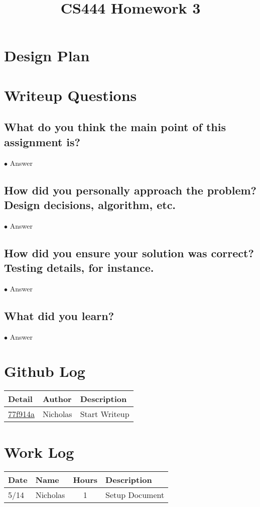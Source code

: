 \documentclass[letterpaper,10pt,fleqn,draftclsnofoot,onecolumn]{IEEEtran}
\title{CS444 Homework 3}
\author{\name}
\begin{document}
	\maketitle
	\hrulefill
	\section*{Design Plan}
	
	\section*{Writeup Questions}
	
	\subsection{What do you think the main point of this assignment is?}
	$\bullet$ Answer
	
	\subsection{How did you personally approach the problem? Design decisions, algorithm, etc.}
	$\bullet$ Answer	
	
	\subsection{How did you ensure your solution was correct? Testing details, for instance.}
	$\bullet$ Answer
	
	\subsection{What did you learn?}
	$\bullet$ Answer

	\section*{ Github Log }
	\begin{tabular}{l l p{1.5in}}\textbf{Detail} & \textbf{Author} & \textbf{Description}\\\hline
		\href{https://github.com/Skinnern/CS444/commit/77f914a6fe466b8115d31d7a97e08b2e86b00b7a}{77f914a} & Nicholas & Start Writeup\\\hline
	\end{tabular}
	
	
	\section*{Work Log}
	\begin{tabular}{l l c p{1.1in}}\textbf{Date} & \textbf{Name} & \textbf{Hours} & \textbf{Description}\\\hline
		5/14 & Nicholas & 1 & Setup Document\\\hline
	\end{tabular}
		\nocite{*}
		
	
\end{document}
